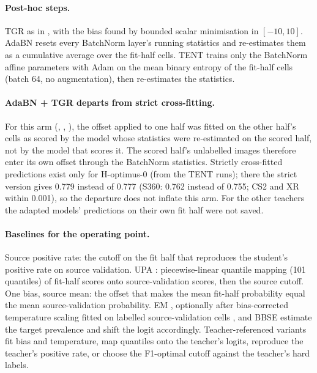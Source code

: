 \paragraph{Post-hoc steps.} TGR as in , with the bias found by bounded scalar minimisation in
$[-10, 10]$. AdaBN resets every BatchNorm layer's running statistics and re-estimates them as a cumulative average over
the fit-half cells. TENT trains only the BatchNorm affine parameters with Adam on the mean binary entropy of the fit-half
cells (batch 64, no augmentation), then re-estimates the statistics.

\paragraph{AdaBN + TGR departs from strict cross-fitting.} For this arm (, ,
), the offset applied to one half was fitted on the other half's cells as scored by the model
whose statistics were re-estimated on the scored half, not by the model that scores it. The scored half's unlabelled
images therefore enter its own offset through the BatchNorm statistics. Strictly cross-fitted predictions exist only
for H-optimus-0 (from the TENT runs); there the strict version gives 0.779 instead of 0.777 (S360: 0.762 instead of
0.755; CS2 and XR within 0.001), so the departure does not inflate this arm. For the other teachers the adapted
models' predictions on their own fit half were not saved.

\paragraph{Baselines for the operating point.} Source positive rate: the cutoff on the fit half that reproduces the
student's positive rate on source validation. UPA \citep{roschewitz2023automatic}: piecewise-linear quantile mapping
(101 quantiles) of fit-half scores onto source-validation scores, then the source cutoff. One bias, source mean: the
offset that makes the mean fit-half probability equal the mean source-validation probability. EM
\citep{saerens2002adjusting}, optionally after bias-corrected temperature scaling fitted on labelled source-validation
cells \citep{alexandari2020maximum}, and BBSE \citep{lipton2018detecting} estimate the target prevalence and shift the
logit accordingly. Teacher-referenced variants fit bias and temperature, map quantiles onto the teacher's logits,
reproduce the teacher's positive rate, or choose the F1-optimal cutoff against the teacher's hard labels.

